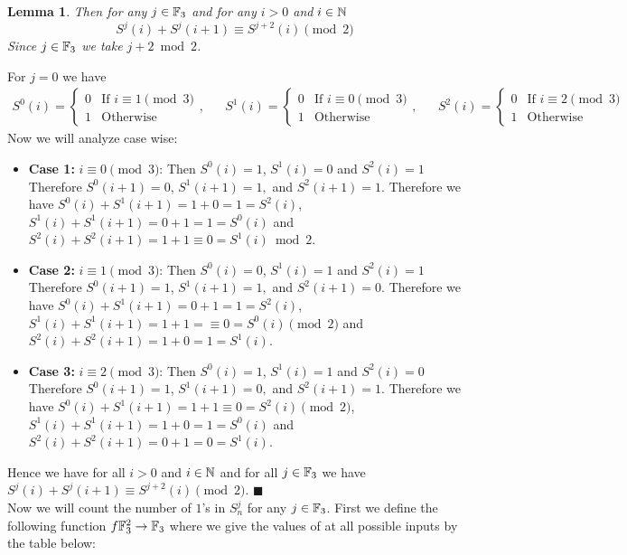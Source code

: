 \documentclass[a4paper, 11pt]{article}
\newtheorem{lemma}{Lemma}
\renewenvironment{proof}{\noindent{\it \textbf{Proof:}}\hspace*{1em}}{\hfill $\blacksquare$\bigskip\\}
\begin{document}
{\begin{lemma}\label{p3lm2}
Then for any $j\in\mathbb{F}_3$ and for any $i>0$ and $i\in\mathbb{N}$ $$S^j(i)+S^j(i+1)\equiv S^{j+2}(i)\pmod 2$$Since $j\in\mathbb{F}_3$ we take $j+2\bmod 2$. 
\end{lemma}
\begin{proof}
	For $j=0$ we have \begin{align*}
		S^0(i)=\begin{cases}
			0 & \text{If $i\equiv 1\pmod 3$}\\
			1 & \text{Otherwise}
		\end{cases}, && S^1(i)=\begin{cases}
		0 & \text{If $i\equiv 0\pmod 3$}\\
		1 & \text{Otherwise}
	\end{cases}, &&S^2(i)=\begin{cases}
	0 & \text{If $i\equiv 2\pmod 3$}\\
	1 & \text{Otherwise}
\end{cases} 
	\end{align*}
Now we will analyze case wise:\begin{itemize}
	\item \textbf{Case 1:} $i\equiv 0\pmod 3$: Then $S^0(i)=1$, $ S^1(i)=0$ and $ S^{2}(i)=1$ Therefore $S^0(i+1)=0$, $S^1(i+1)=1,$ and $ S^{2}(i+1)=1$. Therefore we have $S^0(i)+S^1(i+1)=1+0=1=S^2(i)$, $S^1(i)+S^1(i+1)=0+1=1=S^0(i)$ and $S^2(i)+S^2(i+1)=1+1\equiv 0=S^1(i)\bmod 2$.
	\item \textbf{Case 2:} $i\equiv 1\pmod 3$: Then $S^0(i)=0$, $ S^1(i)=1$ and $ S^{2}(i)=1$ Therefore $S^0(i+1)=1$, $S^1(i+1)=1,$ and $ S^{2}(i+1)=0$. Therefore we have $S^0(i)+S^1(i+1)=0+1=1=S^2(i)$, $S^1(i)+S^1(i+1)=1+1=\equiv 0=S^0(i)\pmod 2$ and $S^2(i)+S^2(i+1)=1+0=1=S^1(i)$.
	\item \textbf{Case 3:} $i\equiv 2\pmod 3$: Then $S^0(i)=1$, $ S^1(i)=1$ and $ S^{2}(i)=0$ Therefore $S^0(i+1)=1$, $S^1(i+1)=0,$ and $ S^{2}(i+1)=1$. Therefore we have $S^0(i)+S^1(i+1)=1+1\equiv 0=S^2(i)\pmod 2$, $S^1(i)+S^1(i+1)=1+0=1=S^0(i)$ and $S^2(i)+S^2(i+1)=0+1= 0=S^1(i)$.
\end{itemize}Hence we have for all $i>0$ and $i\in\mathbb{N}$ and for all $j\in\mathbb{F}_3$ we have $S^j(i)+S^j(i+1)\equiv S^{j+2}(i)\pmod 2$. 
\end{proof}Now we will count the number of $1$'s in $S^j_n$ for any $j\in\mathbb{F}_3$. First we define the following function $f\mathbb{F}_3^2\to\mathbb{F}_3$ where we give the values of at all possible inputs by the table below:

}
\end{document}

